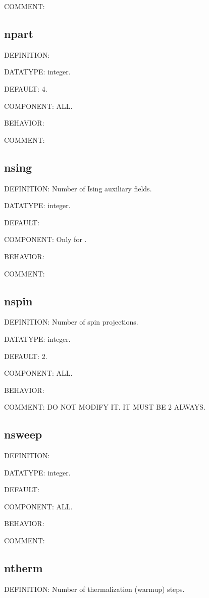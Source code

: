 {\color{olive}COMMENT:}

\subsection{npart}
{\color{red}DEFINITION:}

{\color{green}DATATYPE:} integer.

{\color{blue}DEFAULT:} 4.

{\color{brown}COMPONENT:} ALL.

{\color{purple}BEHAVIOR:}

{\color{olive}COMMENT:}

\subsection{nsing}
{\color{red}DEFINITION:} Number of Ising auxiliary fields.

{\color{green}DATATYPE:} integer.

{\color{blue}DEFAULT:}

{\color{brown}COMPONENT:} Only for {\daisy}.

{\color{purple}BEHAVIOR:}

{\color{olive}COMMENT:}

\subsection{nspin}
{\color{red}DEFINITION:} Number of spin projections.

{\color{green}DATATYPE:} integer.

{\color{blue}DEFAULT:} 2.

{\color{brown}COMPONENT:} ALL.

{\color{purple}BEHAVIOR:}

{\color{olive}COMMENT:} DO NOT MODIFY IT. IT MUST BE 2 ALWAYS.

\subsection{nsweep}
{\color{red}DEFINITION:}

{\color{green}DATATYPE:} integer.

{\color{blue}DEFAULT:}

{\color{brown}COMPONENT:} ALL.

{\color{purple}BEHAVIOR:}

{\color{olive}COMMENT:}

\subsection{ntherm}
{\color{red}DEFINITION:} Number of thermalization (warmup) steps.

